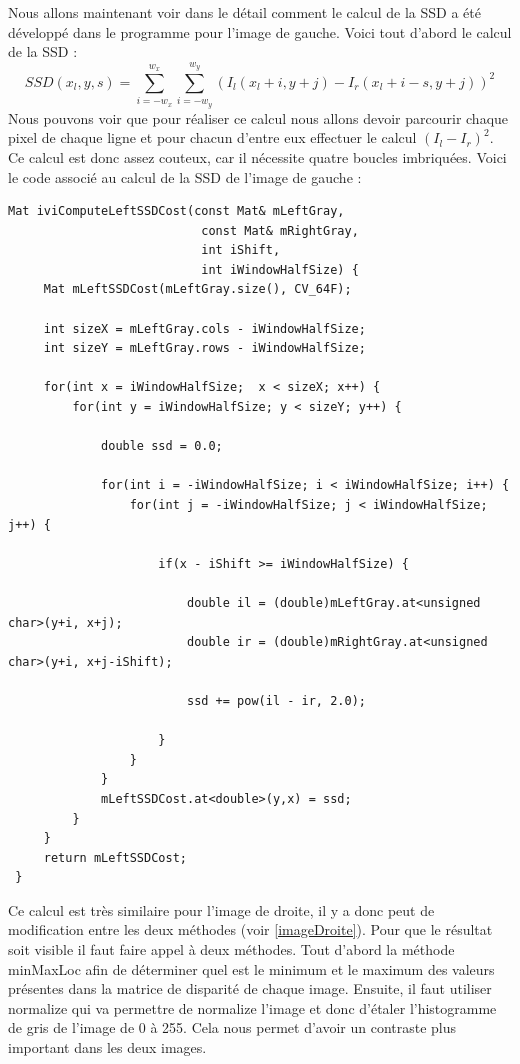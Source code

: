 \documentclass[a4paper,10pt]{article}
\begin{document}
Nous allons maintenant voir dans le détail comment le calcul de la SSD a été développé
dans le programme pour l'image de gauche. Voici tout d'abord le calcul de la SSD :
\begin{equation}
 SSD(x_l,y,s)=\sum_{i=-w_x}^{w_x}\sum_{i=-w_y}^{w_y}(I_l(x_l+i,y+j)-I_r(x_l+i-s,y+j))^2
\end{equation}
Nous pouvons voir que pour réaliser ce calcul nous allons devoir parcourir chaque pixel
de chaque ligne et pour chacun d'entre eux effectuer le calcul $(I_l-I_r)^2$. Ce calcul
est donc assez couteux, car il nécessite quatre boucles imbriquées. Voici le code associé
au calcul de la SSD de l'image de gauche :
\begin{lstlisting}[caption=Calcul de la SSD pour l'image gauche]
Mat iviComputeLeftSSDCost(const Mat& mLeftGray,
                           const Mat& mRightGray,
                           int iShift,
                           int iWindowHalfSize) {
     Mat mLeftSSDCost(mLeftGray.size(), CV_64F);

     int sizeX = mLeftGray.cols - iWindowHalfSize;
     int sizeY = mLeftGray.rows - iWindowHalfSize;
 
     for(int x = iWindowHalfSize;  x < sizeX; x++) {
         for(int y = iWindowHalfSize; y < sizeY; y++) {
 
             double ssd = 0.0;
 
             for(int i = -iWindowHalfSize; i < iWindowHalfSize; i++) {
                 for(int j = -iWindowHalfSize; j < iWindowHalfSize; j++) {
 
                     if(x - iShift >= iWindowHalfSize) {
 
                         double il = (double)mLeftGray.at<unsigned char>(y+i, x+j);
                         double ir = (double)mRightGray.at<unsigned char>(y+i, x+j-iShift);
 
                         ssd += pow(il - ir, 2.0);
 
                     }
                 }
             }
             mLeftSSDCost.at<double>(y,x) = ssd;
         }
     }
     return mLeftSSDCost;
 }
\end{lstlisting}
Ce calcul est très similaire pour l'image de droite, il y a donc peut de modification entre
les deux méthodes (voir \ref{imageDroite}). Pour que le résultat soit visible il faut faire
appel à deux méthodes. Tout d'abord la méthode minMaxLoc afin de déterminer quel est le 
minimum et le maximum des valeurs présentes dans la matrice de disparité de chaque image.
Ensuite, il faut utiliser normalize qui va permettre de normalize l'image et donc d'étaler
l'histogramme de gris de l'image de 0 à 255. Cela nous permet d'avoir un contraste plus 
important dans les deux images.\\
\end{document}
